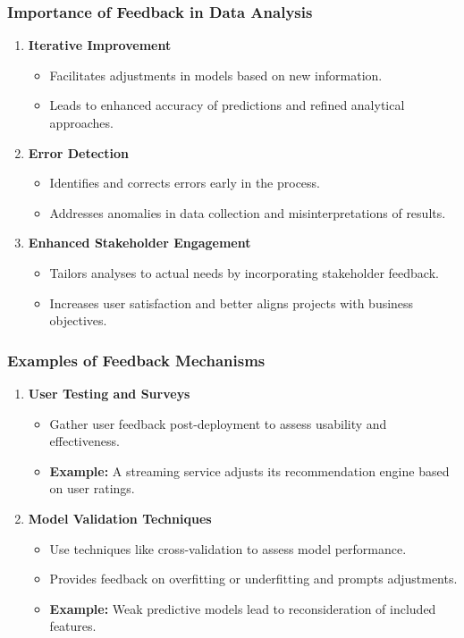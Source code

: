 \documentclass[aspectratio=169]{beamer}
\begin{document}
\begin{frame}[fragile]
    \frametitle{Importance of Feedback in Data Analysis}
    \begin{enumerate}
        \item \textbf{Iterative Improvement}
            \begin{itemize}
                \item Facilitates adjustments in models based on new information.
                \item Leads to enhanced accuracy of predictions and refined analytical approaches.
            \end{itemize}
        \item \textbf{Error Detection}
            \begin{itemize}
                \item Identifies and corrects errors early in the process.
                \item Addresses anomalies in data collection and misinterpretations of results.
            \end{itemize}
        \item \textbf{Enhanced Stakeholder Engagement}
            \begin{itemize}
                \item Tailors analyses to actual needs by incorporating stakeholder feedback.
                \item Increases user satisfaction and better aligns projects with business objectives.
            \end{itemize}
    \end{enumerate}
\end{frame}

\begin{frame}[fragile]
    \frametitle{Examples of Feedback Mechanisms}
    \begin{enumerate}
        \item \textbf{User Testing and Surveys}
            \begin{itemize}
                \item Gather user feedback post-deployment to assess usability and effectiveness.
                \item \textbf{Example:} A streaming service adjusts its recommendation engine based on user ratings.
            \end{itemize}
        \item \textbf{Model Validation Techniques}
            \begin{itemize}
                \item Use techniques like cross-validation to assess model performance.
                \item Provides feedback on overfitting or underfitting and prompts adjustments.
                \item \textbf{Example:} Weak predictive models lead to reconsideration of included features.
            \end{itemize}
    \end{enumerate}
\end{frame}
\end{document}
